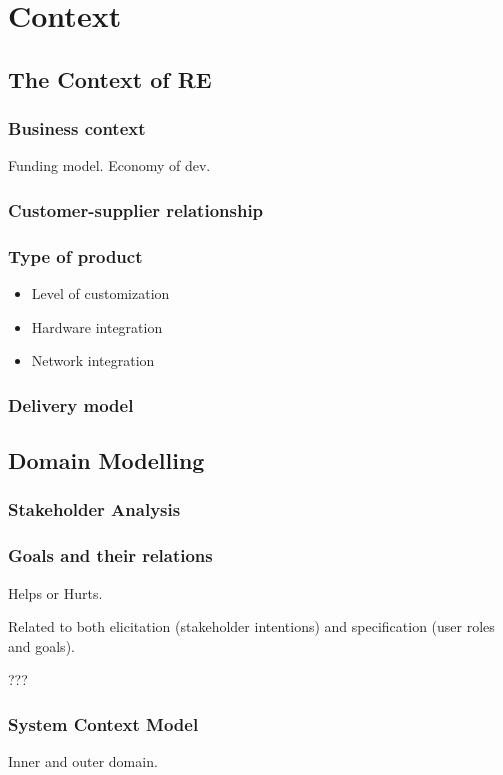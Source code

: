 
\chapter{Context}%

\section{The Context of RE}

\subsection{Business context}
Funding model. Economy of dev.

\subsection{Customer-supplier relationship}

\subsection{Type of product}

\begin{itemize}
  \item Level of customization
  \item Hardware integration
  \item Network integration
\end{itemize}

\subsection{Delivery model}


\section{Domain Modelling}

\subsection{Stakeholder Analysis}

\subsection{Goals and their relations}

Helps or Hurts.

Related to both elicitation (stakeholder intentions) and specification (user roles and goals).

???

\subsection{System Context Model}

Inner and outer domain.






